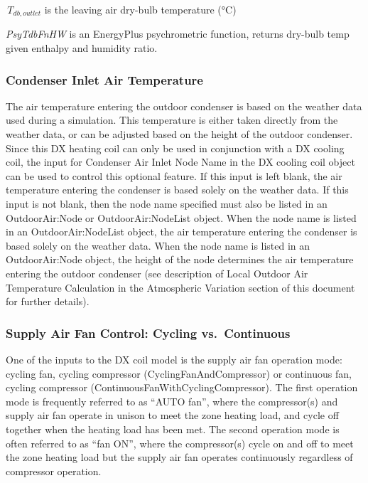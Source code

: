 \(\,{T_{db,outlet}}\) is the leaving air dry-bulb temperature (°C)

\emph{PsyTdbFnHW} is an EnergyPlus psychrometric function, returns dry-bulb temp given enthalpy and humidity ratio.

\subsubsection{Condenser Inlet Air Temperature}\label{condenser-inlet-air-temperature-1}

The air temperature entering the outdoor condenser is based on the weather data used during a simulation. This temperature is either taken directly from the weather data, or can be adjusted based on the height of the outdoor condenser. Since this DX heating coil can only be used in conjunction with a DX cooling coil, the input for Condenser Air Inlet Node Name in the DX cooling coil object can be used to control this optional feature. If this input is left blank, the air temperature entering the condenser is based solely on the weather data. If this input is not blank, then the node name specified must also be listed in an OutdoorAir:Node or OutdoorAir:NodeList object. When the node name is listed in an OutdoorAir:NodeList object, the air temperature entering the condenser is based solely on the weather data. When the node name is listed in an OutdoorAir:Node object, the height of the node determines the air temperature entering the outdoor condenser (see description of Local Outdoor Air Temperature Calculation in the Atmospheric Variation section of this document for further details).

\subsubsection{Supply Air Fan Control: Cycling vs.~Continuous}\label{supply-air-fan-control-cycling-vs.continuous-1}

One of the inputs to the DX coil model is the supply air fan operation mode: cycling fan, cycling compressor (CyclingFanAndCompressor) or continuous fan, cycling compressor (ContinuousFanWithCyclingCompressor). The first operation mode is frequently referred to as ``AUTO fan'', where the compressor(s) and supply air fan operate in unison to meet the zone heating load, and cycle off together when the heating load has been met. The second operation mode is often referred to as ``fan ON'', where the compressor(s) cycle on and off to meet the zone heating load but the supply air fan operates continuously regardless of compressor operation.

